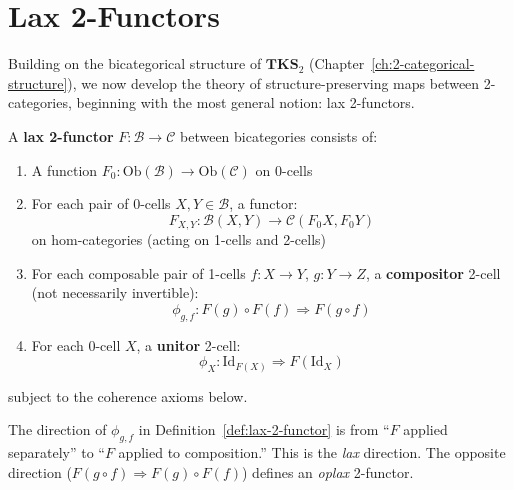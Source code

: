 \section{Lax 2-Functors}
\label{sec:lax-functors}

Building on the bicategorical structure of $\mathbf{TKS}_2$ (Chapter~\ref{ch:2-categorical-structure}),
we now develop the theory of structure-preserving maps between 2-categories, beginning
with the most general notion: lax 2-functors.

\begin{definition}
\label{def:lax-2-functor}
A \textbf{lax 2-functor} $F : \mathcal{B} \to \mathcal{C}$ between bicategories consists of:
\begin{enumerate}[label=(\roman*)]
  \item A function $F_0 : \mathrm{Ob}(\mathcal{B}) \to \mathrm{Ob}(\mathcal{C})$ on 0-cells
  \item For each pair of 0-cells $X, Y \in \mathcal{B}$, a functor:
        \[
          F_{X,Y} : \mathcal{B}(X, Y) \to \mathcal{C}(F_0 X, F_0 Y)
        \]
        on hom-categories (acting on 1-cells and 2-cells)
  \item For each composable pair of 1-cells $f : X \to Y$, $g : Y \to Z$, a
        \textbf{compositor} 2-cell (not necessarily invertible):
        \[
          \phi_{g,f} : F(g) \circ F(f) \Rightarrow F(g \circ f)
        \]
  \item For each 0-cell $X$, a \textbf{unitor} 2-cell:
        \[
          \phi_X : \mathrm{Id}_{F(X)} \Rightarrow F(\mathrm{Id}_X)
        \]
\end{enumerate}
subject to the coherence axioms below.
\end{definition}

\begin{remark}
The direction of $\phi_{g,f}$ in Definition~\ref{def:lax-2-functor} is from
``$F$ applied separately'' to ``$F$ applied to composition.'' This is the
\emph{lax} direction. The opposite direction ($F(g \circ f) \Rightarrow F(g) \circ F(f)$)
defines an \emph{oplax} 2-functor.
\end{remark}

